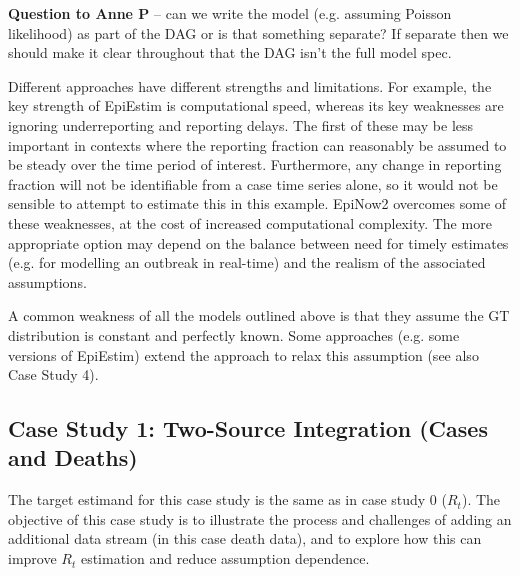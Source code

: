 \documentclass{article}
\begin{document}
\textbf{Question to Anne P} – can we write the model (e.g. assuming Poisson likelihood) as part of the DAG or is that something separate? If separate then we should make it clear throughout that the DAG isn’t the full model spec.

Different approaches have different strengths and limitations. For example, the key strength of EpiEstim is computational speed, whereas its key weaknesses are ignoring underreporting and reporting delays. The first of these may be less important in contexts where the reporting fraction can reasonably be assumed to be steady over the time period of interest. Furthermore, any change in reporting fraction will not be identifiable from a case time series alone, so it would not be sensible to attempt to estimate this in this example. EpiNow2 overcomes some of these weaknesses, at the cost of increased computational complexity. The more appropriate option may depend on the balance between need for timely estimates (e.g. for modelling an outbreak in real-time) and the realism of the associated assumptions. 

A common weakness of all the models outlined above is that they assume the GT distribution is constant and perfectly known. Some approaches (e.g. some versions of EpiEstim) extend the approach to relax this assumption (see also Case Study 4).
 




\subsection{Case Study 1: Two-Source Integration (Cases and Deaths)}

The target estimand for this case study is the same as in case study 0 ($R_t$). The objective of this case study is to illustrate the process and challenges of adding an additional data stream (in this case death data), and to explore how this can improve $R_t$ estimation and reduce assumption dependence.
\end{document}

